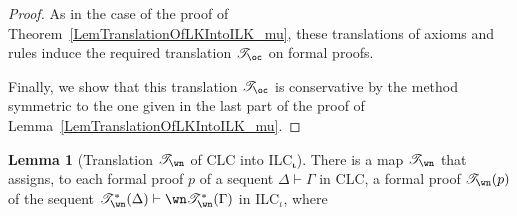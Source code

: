 \documentclass[a4paper]{article}
\theoremstyle{definition}
\theoremstyle{theorem}
\newtheorem{lemma}[definition]{Lemma}
\theoremstyle{remark}
\begin{document}
\begin{proof}
As in the case of the proof of Theorem~\ref{LemTranslationOfLKIntoILK_mu}, these translations of axioms and rules induce the required translation $\mathscr{T}_{\oc}$ on formal proofs.

Finally, we show that this translation $\mathscr{T}_{\oc}$ is conservative by the method symmetric to the one given in the last part of the proof of Lemma~\ref{LemTranslationOfLKIntoILK_mu}.
\end{proof}

\begin{lemma}[Translation $\mathscr{T}_{\wn}$ of \textsf{CLC} into \textsf{ILC$_{\boldsymbol{\iota}}$}]
\label{LemTranslationOfCLLKintoILLK}
There is a map $\mathscr{T}_{\wn}$ that assigns, to each formal proof $p$ of a sequent $\Delta \vdash \Gamma$ in \textsf{CLC}, a formal proof $\mathscr{T}_{\wn}(p)$ of the sequent $\mathscr{T}_{\wn}^\ast(\Delta) \vdash \wn \mathscr{T}_{\wn}^\ast(\Gamma)$ in \textsf{ILC$_\iota$}, where
\end{lemma}
\end{document}
